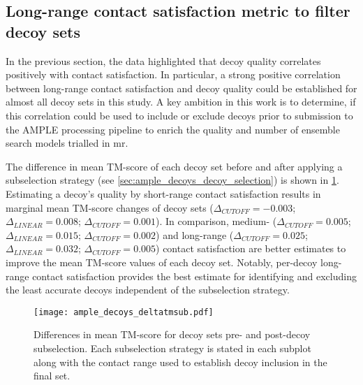 
\subsection{Long-range contact satisfaction metric to filter decoy sets}
In the previous section, the data highlighted that decoy quality correlates positively with contact satisfaction. In particular, a strong positive correlation between long-range contact satisfaction and decoy quality could be established for almost all decoy sets in this study. A key ambition in this work is to determine, if this correlation could be used to include or exclude decoys prior to submission to the AMPLE processing pipeline to enrich the quality and number of ensemble search models trialled in \gls{mr}. 

The difference in mean TM-score of each decoy set before and after applying a subselection strategy (see \cref{sec:ample_decoys_decoy_selection}) is shown in \cref{fig:ample_decoys_deltatmsub}. Estimating a decoy's quality by short-range contact satisfaction results in marginal mean TM-score changes of decoy sets ($\Delta_{CUTOFF}=-0.003$; $\Delta_{LINEAR}=0.008$; $\Delta_{CUTOFF}=0.001$). In comparison, medium- ($\Delta_{CUTOFF}=0.005$; $\Delta_{LINEAR}=0.015$; $\Delta_{CUTOFF}=0.002$) and long-range ($\Delta_{CUTOFF}=0.025$; $\Delta_{LINEAR}=0.032$; $\Delta_{CUTOFF}=0.005$) contact satisfaction are better estimates to improve the mean TM-score values of each decoy set. Notably, per-decoy long-range contact satisfaction provides the best estimate for identifying and excluding the least accurate decoys independent of the subselection strategy. 

\begin{figure}[H]
	\centering
	\texttt{[image: ample\_decoys\_deltatmsub.pdf]}
        \caption[TM-score comparison pre- and post-decoy subselection]{Differences in mean TM-score  for decoy sets pre- and post-decoy subselection. Each subselection strategy is stated in each subplot along with the contact range used to establish decoy inclusion in the final set.}
	\label{fig:ample_decoys_deltatmsub}
\end{figure}

